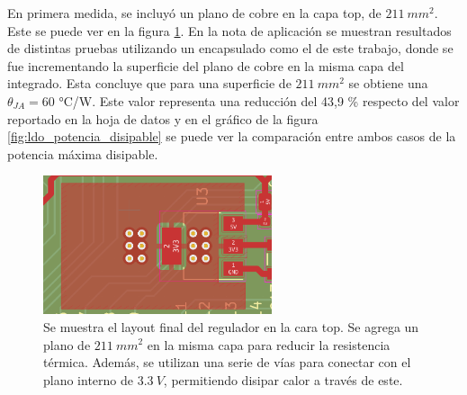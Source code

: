

En primera medida, se incluyó un plano de cobre en la capa top, de $211 \ mm^2$. Este se puede ver en la figura \ref{fig:plano_cobre_top_ldo}. En la nota de aplicación \cite{AN1028_thermal} se muestran resultados de distintas pruebas utilizando un encapsulado como el de este trabajo, donde se fue incrementando la superficie del plano de cobre en la misma capa del integrado. Esta concluye que para una superficie de $211 \ mm^2$ se obtiene una $\theta_{JA} = 60$ °C/W. Este valor representa una reducción del 43,9 \% respecto del valor reportado en la hoja de datos y en el gráfico de la figura \ref{fig:ldo_potencia_disipable} se puede ver la comparación entre ambos casos de la potencia máxima disipable.

\begin{figure}[htb]
    \centering
    \includegraphics[width=0.6\textwidth]{img/plano_cobre_top_ldo.png}
    \caption{Se muestra el layout final del regulador en la cara top. Se agrega un plano de $211 \ mm^2$ en la misma capa para reducir la resistencia térmica. Además, se utilizan una serie de vías para conectar con el plano interno de $3.3 \ V$, permitiendo disipar calor a través de este.}
    \label{fig:plano_cobre_top_ldo}
\end{figure}

